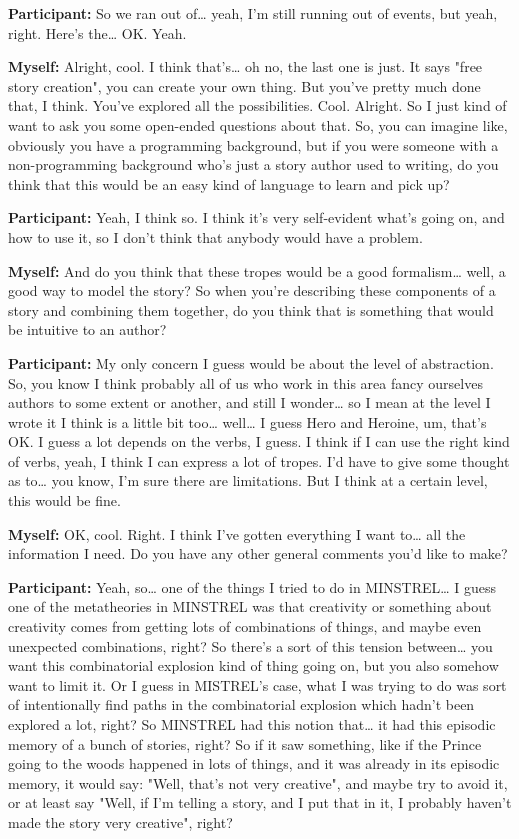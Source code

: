 \documentclass[11pt]{report}
\newcommand{\llabel}[1]{\hypertarget{llineno:#1}{\linelabel{#1}}}
\begin{document}
\begin{linenumbers}
\textbf{Participant:} So we ran out of\ldots{} yeah, I'm still running out of events, but yeah, right. Here's the\ldots{} OK. Yeah.

\textbf{Myself:} Alright, cool. I think that's\ldots{} oh no, the last one is just. It says "free story creation", you can create your own thing. But you've pretty much done that, I think. You've explored all the possibilities. Cool. Alright. So I just kind of want to ask you some open-ended questions about that. So, you can imagine like, obviously you have a programming background, but if you were someone with a non-programming background who's just a story author used to writing, do you think that this would be an easy kind of language to learn and pick up?

\textbf{Participant:} Yeah, I think so. I think it's very self-evident what's
going on, and how to use it, so I don't think that anybody would have a
problem.\llabel{lne:use1g}

\textbf{Myself:} And do you think that these tropes would be a good formalism\ldots{} well, a good way to model the story? So when you're describing these components of a story and combining them together, do you think that is something that would be intuitive to an author?

\textbf{Participant:} My only concern I guess would be about the level of abstraction. So, you know I think probably all of us who work in this area fancy ourselves authors to some extent or another, and still I wonder\ldots{} so I mean at the level I wrote it I think is a little bit too\ldots{} well\ldots{} I guess Hero and Heroine, um, that's OK. I guess a lot depends on the verbs, I guess. I think if I can use the right kind of verbs, yeah, I think I can express a lot of tropes. I'd have to give some thought as to\ldots{} you know, I'm sure there are limitations. But I think at a certain level, this would be fine.\llabel{lne:feature7g}

\textbf{Myself:} OK, cool. Right. I think I've gotten everything I want to\ldots{} all the information I need. Do you have any other general comments you'd like to make?

\textbf{Participant:} Yeah, so\ldots{} one of the things I tried to do in MINSTREL\ldots{} I guess one of the metatheories in MINSTREL was that creativity or something about creativity comes from getting lots of combinations of things, and maybe even unexpected combinations, right? So there's a sort of this tension between\ldots{} you want this combinatorial explosion kind of thing going on, but you also somehow want to limit it. Or I guess in MISTREL's case, what I was trying to do was sort of intentionally find paths in the combinatorial explosion which hadn't been explored a lot, right? So MINSTREL had this notion that\ldots{} it had this episodic memory of a bunch of stories, right? So if it saw something, like if the Prince going to the woods happened in lots of things, and it was already in its episodic memory, it would say: "Well, that's not very creative", and maybe try to avoid it, or at least say "Well, if I'm telling a story, and I put that in it, I probably haven't made the story very creative", right?


\end{linenumbers}
\end{document}
